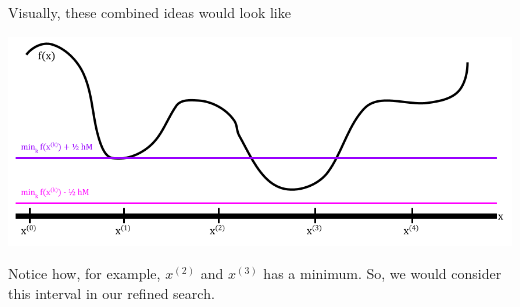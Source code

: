 \documentclass[letterpaper]{article}
\begin{document}
Visually, these combined ideas would look like 
\begin{center}
    \includegraphics[scale=0.5]{../assets/1varopt_ex3.png}
\end{center}
Notice how, for example, $x^{(2)}$ and $x^{(3)}$ has a minimum. So, we would consider this interval in our refined search.
\end{document}
